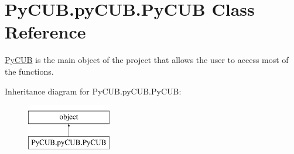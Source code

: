 \hypertarget{class_py_c_u_b_1_1py_c_u_b_1_1_py_c_u_b}{}\section{Py\+C\+U\+B.\+py\+C\+U\+B.\+Py\+C\+UB Class Reference}
\label{class_py_c_u_b_1_1py_c_u_b_1_1_py_c_u_b}


\mbox{\hyperlink{class_py_c_u_b_1_1py_c_u_b_1_1_py_c_u_b}{Py\+C\+UB}} is the main object of the project that allows the user to access most of the functions.  


Inheritance diagram for Py\+C\+U\+B.\+py\+C\+U\+B.\+Py\+C\+UB\+:\begin{figure}[H]
\begin{center}
\leavevmode
\includegraphics[height=2.000000cm]{class_py_c_u_b_1_1py_c_u_b_1_1_py_c_u_b}
\end{center}
\end{figure}

